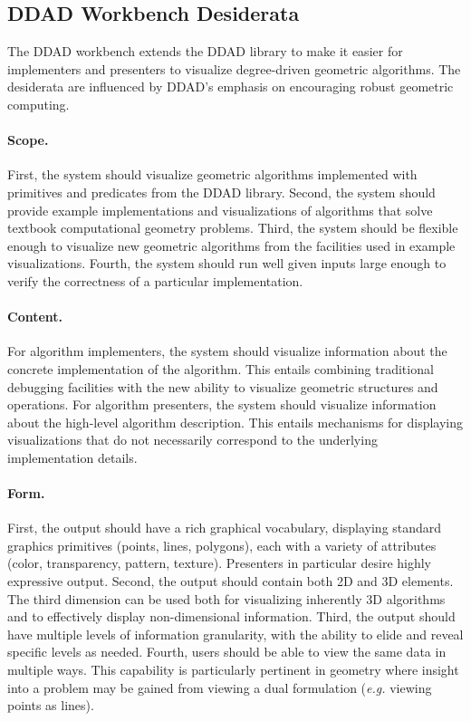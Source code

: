 \subsection{DDAD Workbench Desiderata}

The DDAD workbench extends the DDAD library to make it easier for
implementers and presenters to visualize degree-driven geometric
algorithms. The desiderata are influenced by DDAD's emphasis on encouraging
robust geometric computing.

\paragraph{Scope.} First, the system should visualize geometric algorithms
implemented with primitives and predicates from the DDAD library. Second, the
system should provide example implementations and visualizations of algorithms
that solve textbook computational geometry problems. Third, the system should be
flexible enough to visualize new geometric algorithms from the facilities used
in example visualizations. Fourth, the system should run well given inputs large
enough to verify the correctness of a particular implementation.

\paragraph{Content.} For algorithm implementers, the system should
visualize information about the concrete implementation of the algorithm. This
entails combining traditional debugging facilities with the new ability to
visualize geometric structures and operations. For algorithm presenters, the
system should visualize information about the high-level algorithm description.
This entails mechanisms for displaying visualizations that do not necessarily
correspond to the underlying implementation details.

\paragraph{Form.} First, the output should have a rich graphical vocabulary,
displaying standard graphics primitives (points, lines, polygons), each with a
variety of attributes (color, transparency, pattern, texture). Presenters in
particular desire highly expressive output. Second, the output should contain
both 2D and 3D elements. The third dimension can be used both for visualizing
inherently 3D algorithms and to effectively display non-dimensional information.
Third, the output should have multiple levels of information granularity, with
the ability to elide and reveal specific levels as needed. Fourth, users should
be able to view the same data in multiple ways. This capability is particularly
pertinent in geometry where insight into a problem may be gained from viewing a
dual formulation (\emph{e.g.} viewing points as lines).

